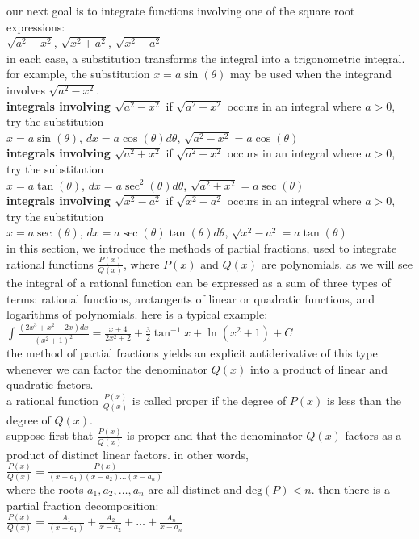 \documentclass{article}
\begin{document}
our next goal is to integrate functions involving one of the square root expressions:\\ $\sqrt{a^2 - x^2}$, $\sqrt{x^2 + a^2}$, $\sqrt{x^2 - a^2}$\\ in each case, a substitution transforms the integral into a trigonometric integral. for example, the substitution $x = a\sin(\theta)$ may be used when the integrand involves $\sqrt{a^2 - x^2}$.\\

\textbf{integrals involving $\sqrt{a^2 - x^2}$} if $\sqrt{a^2 - x^2}$ occurs in an integral where $a > 0$, try the substitution\\
$x = a\sin(\theta)$, $dx = a\cos(\theta)d\theta$, $\sqrt{a^2 - x^2} = a\cos(\theta)$\\

\textbf{integrals involving $\sqrt{a^2 + x^2}$} if $\sqrt{a^2 + x^2}$ occurs in an integral where $a > 0$, try the substitution\\
$x = a\tan(\theta)$, $dx = a\sec^2(\theta)d\theta$, $\sqrt{a^2 + x^2} = a\sec(\theta)$\\

\textbf{integrals involving $\sqrt{x^2 - a^2}$} if $\sqrt{x^2 - a^2}$ occurs in an integral where $a > 0$, try the substitution\\
$x = a\sec(\theta)$, $dx = a\sec(\theta)\tan(\theta)d\theta$, $\sqrt{x^2 - a^2} = a\tan(\theta)$\\

in this section, we introduce the methods of partial fractions, used to integrate rational functions $\frac{P(x)}{Q(x)}$, where $P(x)$ and $Q(x)$ are polynomials. as we will see the integral of a rational function can be expressed as a sum of three types of terms: rational functions, arctangents of linear or quadratic functions, and logarithms of polynomials. here is a typical example:\\ $\int\frac{(2x^3 + x^2 - 2x)dx}{(x^2 + 1)^2} = \frac{x + 4}{2x^2 + 2} + \frac{3}{2}\tan^{-1}x + \ln(x^2 + 1) + C$\\ the method of partial fractions yields an explicit antiderivative of this type whenever we can factor the denominator $Q(x)$ into a product of linear and quadratic factors.\\ a rational function $\frac{P(x)}{Q(x)}$ is called proper if the degree of $P(x)$ is less than the degree of $Q(x)$.\\ suppose first that $\frac{P(x)}{Q(x)}$ is proper and that the denominator $Q(x)$ factors as a product of distinct linear factors. in other words,\\
$\frac{P(x)}{Q(x)} = \frac{P(x)}{(x - a_1)(x - a_2)\ldots(x - a_n)}$\\
where the roots $a_1, a_2, \ldots, a_n$ are all distinct and $\text{deg}(P) < n$. then there is a partial fraction decomposition:\\ 
$\frac{P(x)}{Q(x)} = \frac{A_1}{(x - a_1)} + \frac{A_2}{x - a_2} + \ldots + \frac{A_n}{x - a_n}$\\
\end{document}
